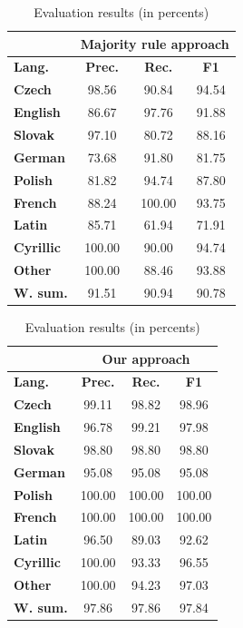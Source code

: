 \documentclass{acm_proc_article-sp}
\begin{document}
{\begin{table}[]
 \centering
 \caption{Evaluation results (in percents)}
 \label{evalres}
 \vspace{0.5cm}
 \begin{tabular}{l||c|c|c|}
       &
     \multicolumn{3}{|c}{\textbf{Majority rule approach}} \\ \hline
     \textbf{Lang.}    & \textbf{Prec.}  & \textbf{Rec.}   & \textbf{F1}  \\ \hline
     \textbf{Czech}    & 98.56  & 90.84  & 94.54 \\
     \textbf{English}  & 86.67  & 97.76  & 91.88 \\
     \textbf{Slovak}   & 97.10  & 80.72  & 88.16 \\
     \textbf{German}   & 73.68  & 91.80  & 81.75 \\
     \textbf{Polish}   & 81.82  & 94.74  & 87.80 \\
     \textbf{French}   & 88.24  & 100.00 & 93.75 \\ \hline
     \textbf{Latin}    & 85.71  & 61.94  & 71.91 \\
     \textbf{Cyrillic} & 100.00 & 90.00  & 94.74 \\
     \textbf{Other}    & 100.00 & 88.46  & 93.88 \\ \hline \hline
     \textbf{W. sum.}  & 91.51  & 90.94  & 90.78 \\
 \end{tabular}
 \end{table}


 \begin{table}[]
 \centering
 \caption{Evaluation results (in percents)}
 \label{evalres}
 \vspace{0.5cm}
 \begin{tabular}{l||c|c|c|}
       &
     \multicolumn{3}{|c}{\textbf{Our approach}} \\ \hline
     \textbf{Lang.}    & \textbf{Prec.}  & \textbf{Rec.}   & \textbf{F1} \\ \hline
     \textbf{Czech}    & 99.11  & 98.82  & 98.96  \\
     \textbf{English}  & 96.78  & 99.21  & 97.98  \\
     \textbf{Slovak}   & 98.80  & 98.80  & 98.80  \\
     \textbf{German}   & 95.08  & 95.08  & 95.08  \\
     \textbf{Polish}   & 100.00 & 100.00 & 100.00 \\
     \textbf{French}   & 100.00 & 100.00 & 100.00 \\ \hline
     \textbf{Latin}    & 96.50  & 89.03  & 92.62  \\
     \textbf{Cyrillic} & 100.00 & 93.33  & 96.55  \\
     \textbf{Other}    & 100.00 & 94.23  & 97.03  \\ \hline \hline
     \textbf{W. sum.}  & 97.86  & 97.86  & 97.84  \\
 \end{tabular}
 \end{table}

}
\end{document}
